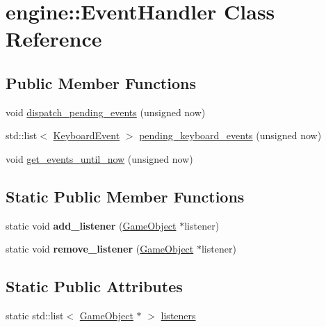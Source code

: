 \hypertarget{classengine_1_1_event_handler}{}\section{engine\+:\+:Event\+Handler Class Reference}
\label{classengine_1_1_event_handler}
\subsection*{Public Member Functions}
\begin{DoxyCompactItemize}
\item 
void \hyperlink{classengine_1_1_event_handler_a7897cdaa9aa300a3d73790ab9245ff62}{dispatch\+\_\+pending\+\_\+events} (unsigned now)
\item 
std\+::list$<$ \hyperlink{classengine_1_1_keyboard_event}{Keyboard\+Event} $>$ \hyperlink{classengine_1_1_event_handler_a615ce0d67badc44977c3f71ecb911243}{pending\+\_\+keyboard\+\_\+events} (unsigned now)
\item 
void \hyperlink{classengine_1_1_event_handler_a6fc13e4f43fe29d3aafa1ed29018b6d2}{get\+\_\+events\+\_\+until\+\_\+now} (unsigned now)
\end{DoxyCompactItemize}
\subsection*{Static Public Member Functions}
\begin{DoxyCompactItemize}
\item 
static void {\bfseries add\+\_\+listener} (\hyperlink{classengine_1_1_game_object}{Game\+Object} $\ast$listener)\hypertarget{classengine_1_1_event_handler_abd94800bc506be842842ceb02078c5bd}{}\label{classengine_1_1_event_handler_abd94800bc506be842842ceb02078c5bd}

\item 
static void {\bfseries remove\+\_\+listener} (\hyperlink{classengine_1_1_game_object}{Game\+Object} $\ast$listener)\hypertarget{classengine_1_1_event_handler_ab52cff70241d86a0c7d7f0b981ef5276}{}\label{classengine_1_1_event_handler_ab52cff70241d86a0c7d7f0b981ef5276}

\end{DoxyCompactItemize}
\subsection*{Static Public Attributes}
\begin{DoxyCompactItemize}
\item 
static std\+::list$<$ \hyperlink{classengine_1_1_game_object}{Game\+Object} $\ast$ $>$ \hyperlink{classengine_1_1_event_handler_aabe7a62c9fdb036d998630f4ed86d2de}{listeners}
\end{DoxyCompactItemize}


